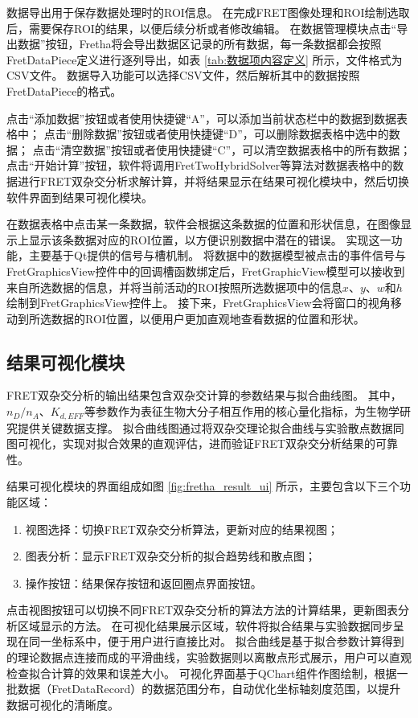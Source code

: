数据导出用于保存数据处理时的ROI信息。
在完成FRET图像处理和ROI绘制选取后，需要保存ROI的结果，以便后续分析或者修改编辑。
在数据管理模块点击“导出数据”按钮，Fretha将会导出数据区记录的所有数据，每一条数据都会按照FretDataPiece定义进行逐列导出，如表 \ref{tab:数据项内容定义} 所示，文件格式为CSV文件。
数据导入功能可以选择CSV文件，然后解析其中的数据按照FretDataPiece的格式。

点击“添加数据”按钮或者使用快捷键“A”，可以添加当前状态栏中的数据到数据表格中；
点击“删除数据”按钮或者使用快捷键“D”，可以删除数据表格中选中的数据；
点击“清空数据”按钮或者使用快捷键“C”，可以清空数据表格中的所有数据；
点击“开始计算”按钮，软件将调用FretTwoHybridSolver等算法对数据表格中的数据进行FRET双杂交分析求解计算，并将结果显示在结果可视化模块中，然后切换软件界面到结果可视化模块。

在数据表格中点击某一条数据，软件会根据这条数据的位置和形状信息，在图像显示上显示该条数据对应的ROI位置，以方便识别数据中潜在的错误。
实现这一功能，主要基于Qt提供的信号与槽机制。
将数据中的数据模型被点击的事件信号与FretGraphicsView控件中的回调槽函数绑定后，FretGraphicView模型可以接收到来自所选数据的信息，并将当前活动的ROI按照所选数据项中的信息$x$、$y$、$w$和$h$绘制到FretGraphicsView控件上。
接下来，FretGraphicsView会将窗口的视角移动到所选数据的ROI位置，以便用户更加直观地查看数据的位置和形状。

\subsection{结果可视化模块}
\label{sec:结果可视化模块}
\ifshowtext
FRET双杂交分析的输出结果包含双杂交计算的参数结果与拟合曲线图。
其中，$n_D/n_A$、$K_{d,EFF}$等参数作为表征生物大分子相互作用的核心量化指标，为生物学研究提供关键数据支撑。
拟合曲线图通过将双杂交理论拟合曲线与实验散点数据同图可视化，实现对拟合效果的直观评估，进而验证FRET双杂交分析结果的可靠性。

结果可视化模块的界面组成如图 \ref{fig:fretha_result_ui} 所示，主要包含以下三个功能区域：
\begin{enumerate}
  \item 视图选择：切换FRET双杂交分析算法，更新对应的结果视图；
  \item 图表分析：显示FRET双杂交分析的拟合趋势线和散点图；
  \item 操作按钮：结果保存按钮和返回圈点界面按钮。
\end{enumerate}

点击视图按钮可以切换不同FRET双杂交分析的算法方法的计算结果，更新图表分析区域显示的方法。
在可视化结果展示区域，软件将拟合结果与实验数据同步呈现在同一坐标系中，便于用户进行直接比对。
拟合曲线是基于拟合参数计算得到的理论数据点连接而成的平滑曲线，实验数据则以离散点形式展示，用户可以直观检查拟合计算的效果和误差大小。
可视化界面基于QChart组件作图绘制，根据一批数据（FretDataRecord）的数据范围分布，自动优化坐标轴刻度范围，以提升数据可视化的清晰度。

